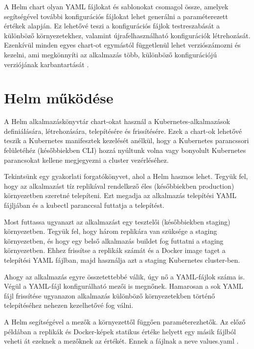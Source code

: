 A Helm chart olyan YAML fájlokat és sablonokat csomagol össze, amelyek segítségével további konfigurációs fájlokat lehet generálni a paraméterezett értékek alapján.
Ez lehetővé teszi a konfigurációs fájlok testreszabását a különböző környezetekhez, valamint újrafelhasználható konfigurációk létrehozását.
Ezenkívül minden egyes chart-ot egymástól függetlenül lehet verziószámozni és kezelni, ami megkönnyíti az alkalmazás több, különböző konfigurációjú verziójának karbantartását \cite{helm}.

\section{Helm működése}
A Helm alkalmazáskönyvtár chart-okat használ a Kubernetes-alkalmazások definiálására, létrehozására, telepítésére és frissítésére.
Ezek a chart-ok lehetővé teszik a Kubernetes manifesztek kezelését anélkül, hogy a Kubernetes parancssori felületéhéz (későbbiekben CLI) hozzá nyúltunk volna vagy bonyolult Kubernetes parancsokat kellene megjegyezni a cluster vezérléséhez.

Tekintsünk egy gyakorlati forgatókönyvet, ahol a Helm hasznos lehet.
Tegyük fel, hogy az alkalmazást tíz replikával rendelkező éles (későbbiekben production) környezetben szeretné telepíteni.
Ezt megadja az alkalmazás telepítési YAML fájljában és a kubectl paranccsal futtatja a telepítést.

Most futtassa ugyanazt az alkalmazást egy tesztelői (későbbiekben staging) környezetben.
Tegyük fel, hogy három replikára van szüksége a staging környezetben, és hogy egy belső alkalmazás buildet fog futtatni a staging környezetben.
Ehhez frissítse a replikák számát és a Docker image taget a telepítési YAML fájlban, majd használja azt a staging Kubernetes cluster-ben.

Ahogy az alkalmazás egyre összetettebbé válik, úgy nő a YAML-fájlok száma is.
Végül a YAML-fájl konfigurálható mezői is megnőnek.
Hamarosan a sok YAML fájl frissítése ugyanazon alkalmazás különböző környezetekben történő telepítéséhez nehezen kezelhetővé fog válni.

A Helm segítségével a mezők a környezettől függően paraméterezhetők.
Az előző példában a replikák és Docker-képek statikus értéke helyett egy másik fájlból veheti át ezeknek a mezőknek az értékét.
Ennek a fájlnak a neve values.yaml \cite{helm}.

